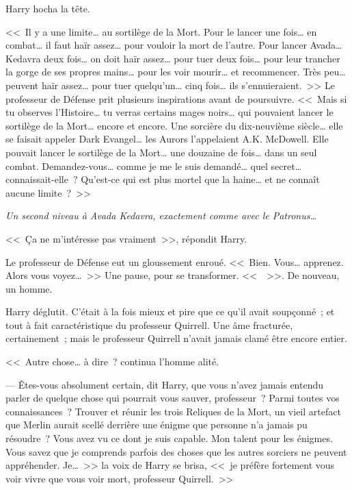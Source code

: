Harry hocha la tête.

<<~Il y a une limite… au sortilège de la Mort. Pour le lancer une fois… en combat… il faut haïr assez… pour vouloir la mort de l'autre. Pour lancer Avada… Kedavra deux fois… on doit haïr assez… pour tuer deux fois… pour leur trancher la gorge de ses propres mains… pour les voir mourir… et recommencer. Très peu… peuvent haïr assez… pour tuer quelqu'un… cinq fois… ils s'ennuieraient.~>> Le professeur de Défense prit plusieurs inspirations avant de poursuivre. <<~Mais si tu observes l'Histoire… tu verras certains mages noirs… qui pouvaient lancer le sortilège de la Mort… encore et encore. Une sorcière du dix-neuvième siècle… elle se faisait appeler Dark Evangel… les Aurors l'appelaient A.K. McDowell. Elle pouvait lancer le sortilège de la Mort… une douzaine de fois… dans un seul combat. Demandez-vous… comme je me le suis demandé… quel secret… connaissait-elle~? Qu'est-ce qui est plus mortel que la haine… et ne connaît aucune limite~?~>>

\emph{Un second niveau à Avada Kedavra, exactement comme avec le Patronus…}

<<~Ça ne m'intéresse pas vraiment~>>, répondit Harry.

Le professeur de Défense eut un gloussement enroué. <<~Bien. Vous… apprenez. Alors vous voyez…~>> Une pause, pour se transformer. <<~~>>. De nouveau, un homme.

Harry déglutit. C'était à la fois mieux et pire que ce qu'il avait soupçonné~; et tout à fait caractéristique du professeur Quirrell. Une âme fracturée, certainement~; mais le professeur Quirrell n'avait jamais clamé être encore entier.

<<~Autre chose… à dire~? continua l'homme alité.

--- Êtes-vous absolument certain, dit Harry, que vous n'avez jamais entendu parler de quelque chose qui pourrait vous sauver, professeur~? Parmi toutes vos connaissances~? Trouver et réunir les trois Reliques de la Mort, un vieil artefact que Merlin aurait scellé derrière une énigme que personne n'a jamais pu résoudre~? Vous avez vu ce dont je suis capable. Mon talent pour les énigmes. Vous savez que je comprends parfois des choses que les autres sorciers ne peuvent appréhender. Je…~>> la voix de Harry se brisa, <<~je préfère fortement vous voir vivre que vous voir mort, professeur Quirrell.~>>


